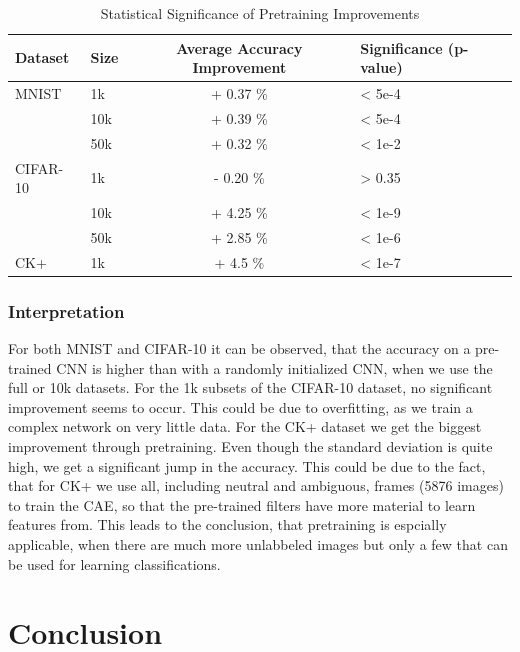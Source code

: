 \documentclass{article}
\begin{document}
    \begin{table}
      \caption{Statistical Significance of Pretraining Improvements}
      \label{table:significance}
      \centering
      \begin{tabular}{llcl}
        \toprule
        Dataset     & Size    & Average Accuracy Improvement & Significance (p-value) \\
        \midrule
        MNIST & 1k    & + 0.37 \%  & < 5e-4 \\
              & 10k   & + 0.39 \%  & < 5e-4 \\
              & 50k   & + 0.32 \%  & < 1e-2 \\
        \midrule
        CIFAR-10  & 1k    & - 0.20 \% & > 0.35\\
                  & 10k   & + 4.25 \% & < 1e-9\\
                  & 50k   & + 2.85 \% & < 1e-6\\
        \midrule
        CK+     & 1k & + 4.5 \%      & < 1e-7 \\
        \bottomrule
      \end{tabular}
    \end{table}

    \subsubsection{Interpretation}
      For both MNIST and CIFAR-10 it can be observed, that the accuracy on a pre-trained CNN is higher than with a randomly initialized CNN, when we use the full or 10k datasets.
      For the 1k subsets of the CIFAR-10 dataset, no significant improvement seems to occur. This could be due to overfitting, as we train a complex network on very little data.
      For the CK+ dataset we get the biggest improvement through pretraining.
      Even though the standard deviation is quite high, we get a significant jump in the accuracy.
      This could be due to the fact, that for CK+ we use all, including neutral and ambiguous, frames (5876 images) to train the CAE, so that the pre-trained filters have more material to learn features from.
      This leads to the conclusion, that pretraining is espcially applicable, when there are much more unlabbeled images but only a few that can be used for learning classifications.

\section{Conclusion}
\end{document}
